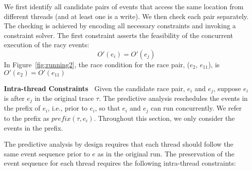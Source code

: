 We first identify all candidate pairs of events that access the same location from different threads (and at least one is a write). We then check each pair  separately.   The checking is achieved by encoding all necessary constraints and invoking a constraint solver.  The first constraint asserts the feasibility of the concurrent execution of the racy events:
$$
O'(e_i) = O'(e_{j})
$$
In Figure~\ref{fig:running2}, the race condition for the race pair, ($e_2$, $e_{11}$), is $O'(e_2)=O'(e_{11})$


{\bf Intra-thread Constraints\ } Given the candidate race pair, $e_i$ and $e_j$, suppose $e_i$ is after $e_j$ in the original trace $\tau$. The predictive analysis reschedules the events in the prefix of $e_i$, i.e., prior to $e_i$, so that $e_i$ and $e_j$ can run concurrently. We refer to the prefix as $prefix(\tau, e_i)$. Throughout this section, we only consider the events in the prefix. 

The predictive analysis by design requires that each thread should follow the same event sequence prior to $e$ as in the original run.  The preservation of the event sequence for each thread requires the following intra-thread constraints:

